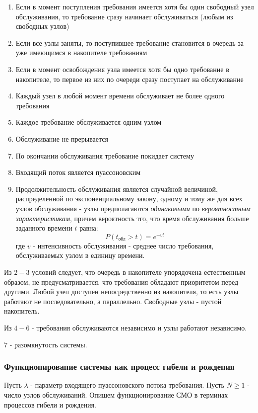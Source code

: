 \documentclass[aps,%
12pt,%
final,%
oneside,
onecolumn,%
musixtex, %
superscriptaddress,%
centertags]{article} %
\theoremstyle{plain}
\theoremstyle{definition}
\theoremstyle{remark}
\begin{document}
\begin{enumerate}
	\item Если в момент поступления требования имеется хотя бы один свободный узел обслуживания, то требование сразу начинает обслуживаться (любым из свободных узлов)
	\item Если все узлы заняты, то поступившее требование становится в очередь за уже имеющимся в накопителе требованиям
	\item Если в момент освобождения узла имеется хотя бы одно требование в накопителе, то первое из них по очереди сразу поступает на обслуживание 
	\item Каждый узел в любой момент времени обслуживает не более одного требования
	\item Каждое требование обслуживается одним узлом 
	\item Обслуживание не прерывается
	\item По окончании обслуживания требование покидает систему
	\item Входящий поток является пуассоновским
	\item Продолжительность обслуживания является случайной величиной, распределенной по экспоненциальному закону, одному и тому же для всех узлов обслуживания - узлы предполагаются \textit{одинаковыми} по \textit{вероятностным характеристикам}, причем вероятность тго, что время обслуживания больше заданного времени $t$ равна:
	$$P(t_{\text{обл}} > t) = e^{-vt}$$
	где $v$ - интенсивность обслуживания - среднее число требования, обслуживаемых узлом в единицу времени.
\end{enumerate}

Из $2-3$ условий следует, что очередь в накопителе упорядочена естественным образом, не предусматривается, что требования обладают приоритетом перед другими. Любой узел доступен непосредственно из накопителя, то есть узлы работают не последовательно, а параллельно. Свободные узлы - пустой накопитель.

Из $4-6$ - требования обслуживаются независимо и узлы работают независимо. 

$7$ - разомкнутость системы.

\subsubsection{Функционирование системы как процесс гибели и рождения}

Пусть $\lambda$ - параметр входящего пуассоновского потока требования. Пусть $N \geq 1$ - число узлов обслуживаний. Опишем функционирование СМО в терминах процессов гибели и рождения.
\end{document}
